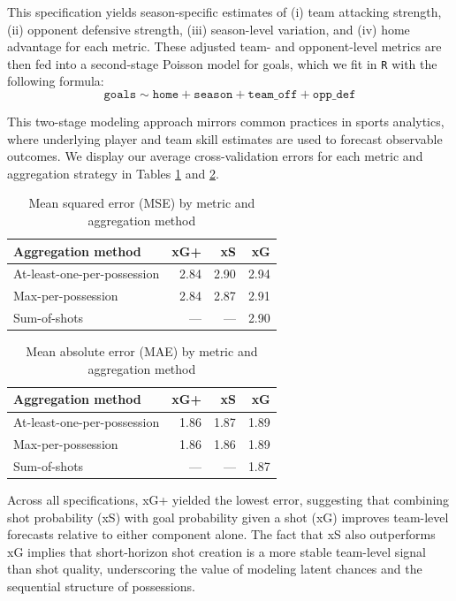 \documentclass[12pt,letterpaper]{article}
\begin{document}
This specification yields season-specific estimates of (i) team attacking strength, (ii) opponent defensive strength, (iii) season-level variation, and (iv) home advantage for each metric. These adjusted team- and opponent-level metrics are then fed into a second-stage Poisson model for goals, which we fit in \texttt{R} with the following formula:
\begin{equation*}
\texttt{goals} \sim \texttt{home} + \texttt{season} + \texttt{team\_off} + \texttt{opp\_def}
\end{equation*}

This two-stage modeling approach mirrors common practices in sports analytics, where underlying player and team skill estimates are used to forecast observable outcomes. We display our average cross-validation errors for each metric and aggregation strategy in Tables \ref{tab:mse} and \ref{tab:mae}.


\begin{table}[H]
\centering
\caption{Mean squared error (MSE) by metric and aggregation method}
\label{tab:mse}
\begin{tabular}{lrrr}
\toprule
\textbf{Aggregation method} & \textbf{xG+} & \textbf{xS} & \textbf{xG} \\
\midrule
At-least-one-per-possession & 2.84 & 2.90 & 2.94 \\
Max-per-possession          & 2.84 & 2.87 & 2.91 \\
Sum-of-shots                & ---  & ---  & 2.90 \\
\bottomrule
\end{tabular}
\end{table}


\begin{table}[H]
\centering
\caption{Mean absolute error (MAE) by metric and aggregation method}
\label{tab:mae}
\begin{tabular}{lrrr}
\toprule
\textbf{Aggregation method} & \textbf{xG+} & \textbf{xS} & \textbf{xG} \\
\midrule
At-least-one-per-possession & 1.86 & 1.87 & 1.89 \\
Max-per-possession          & 1.86 & 1.86 & 1.89 \\
Sum-of-shots                & ---  & ---  & 1.87 \\
\bottomrule
\end{tabular}
\end{table}


Across all specifications, xG+ yielded the lowest error, suggesting that combining shot probability (xS) with goal probability given a shot (xG) improves team-level forecasts relative to either component alone. The fact that xS also outperforms xG implies that short-horizon shot creation is a more stable team-level signal than shot quality, underscoring the value of modeling latent chances and the sequential structure of possessions.
\end{document}

